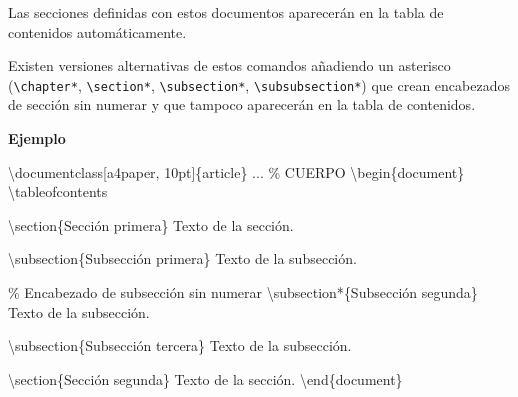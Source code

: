 \documentclass[
  letterpaper,
  DIV=11,
  numbers=noendperiod]{scrreport}
\newenvironment{Shaded}{\begin{snugshade}}{\end{snugshade}}
\newcommand{\BuiltInTok}[1]{\textcolor[rgb]{0.00,0.23,0.31}{#1}}
\newcommand{\CommentTok}[1]{\textcolor[rgb]{0.37,0.37,0.37}{#1}}
\newcommand{\ExtensionTok}[1]{\textcolor[rgb]{0.00,0.23,0.31}{#1}}
\newcommand{\FunctionTok}[1]{\textcolor[rgb]{0.28,0.35,0.67}{#1}}
\newcommand{\KeywordTok}[1]{\textcolor[rgb]{0.00,0.23,0.31}{#1}}
\newcommand{\NormalTok}[1]{\textcolor[rgb]{0.00,0.23,0.31}{#1}}
\begin{document}
Las secciones definidas con estos documentos aparecerán en la tabla de
contenidos automáticamente.

Existen versiones alternativas de estos comandos añadiendo un asterisco
(\texttt{\textbackslash{}chapter*}, \texttt{\textbackslash{}section*},
\texttt{\textbackslash{}subsection*},
\texttt{\textbackslash{}subsubsection*}) que crean encabezados de
sección sin numerar y que tampoco aparecerán en la tabla de contenidos.

\textbf{Ejemplo}

\begin{Shaded}
\begin{Highlighting}[]
\BuiltInTok{\textbackslash{}documentclass}\NormalTok{[a4paper, 10pt]\{}\ExtensionTok{article}\NormalTok{\}}
\NormalTok{...}
\CommentTok{\% CUERPO}
\KeywordTok{\textbackslash{}begin}\NormalTok{\{}\ExtensionTok{document}\NormalTok{\}}
\FunctionTok{\textbackslash{}tableofcontents}

\KeywordTok{\textbackslash{}section}\NormalTok{\{Sección primera\}}
\NormalTok{Texto de la sección.}

\KeywordTok{\textbackslash{}subsection}\NormalTok{\{Subsección primera\}}
\NormalTok{Texto de la subsección.}

\CommentTok{\% Encabezado de subsección sin numerar}
\KeywordTok{\textbackslash{}subsection*}\NormalTok{\{Subsección segunda\}}
\NormalTok{Texto de la subsección.}

\KeywordTok{\textbackslash{}subsection}\NormalTok{\{Subsección tercera\}}
\NormalTok{Texto de la subsección.}

\KeywordTok{\textbackslash{}section}\NormalTok{\{Sección segunda\}}
\NormalTok{Texto de la sección.}
\KeywordTok{\textbackslash{}end}\NormalTok{\{}\ExtensionTok{document}\NormalTok{\}}
\end{Highlighting}
\end{Shaded}
\end{document}
